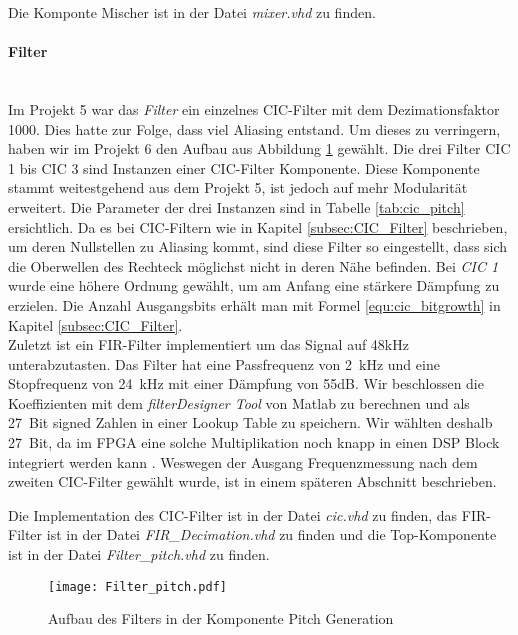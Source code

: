 Die Komponte Mischer ist in der Datei \textit{mixer.vhd} zu finden.

\paragraph{Filter}\mbox{}\\

Im Projekt 5 war das \textit{Filter} ein einzelnes CIC-Filter mit dem Dezimationsfaktor 1000. Dies hatte zur Folge, dass viel Aliasing entstand. Um dieses zu verringern, haben wir im Projekt 6 den Aufbau aus Abbildung \ref{img:Filter_Pitch} gewählt. Die drei Filter CIC 1 bis CIC 3 sind Instanzen einer CIC-Filter Komponente. Diese Komponente stammt weitestgehend aus dem Projekt 5, ist jedoch auf mehr Modularität erweitert. Die Parameter der drei Instanzen sind in Tabelle \ref{tab:cic_pitch} ersichtlich. Da es bei CIC-Filtern wie in Kapitel \ref{subsec:CIC_Filter} beschrieben, um deren Nullstellen zu Aliasing kommt, sind diese Filter so eingestellt, dass sich die Oberwellen des Rechteck möglichst nicht in deren Nähe befinden. Bei \textit{CIC 1} wurde eine höhere Ordnung gewählt, um am Anfang eine stärkere Dämpfung zu erzielen. Die Anzahl Ausgangsbits erhält man mit Formel \ref{equ:cic_bitgrowth} in Kapitel \ref{subsec:CIC_Filter}.\\
Zuletzt ist ein FIR-Filter implementiert um das Signal auf 48kHz unterabzutasten. Das Filter hat eine Passfrequenz von \SI{2}{kHz} und eine Stopfrequenz von \SI{24}{kHz} mit einer Dämpfung von 55dB. Wir beschlossen die Koeffizienten mit dem \textit{filterDesigner Tool} von Matlab zu berechnen und als \SI{27}{Bit} signed Zahlen in einer Lookup Table zu speichern. Wir wählten deshalb \SI{27}{Bit}, da im FPGA eine solche Multiplikation noch knapp in einen DSP Block integriert werden kann \cite{Cyclone_V}.
Weswegen der Ausgang Frequenzmessung nach dem zweiten CIC-Filter gewählt wurde, ist in einem späteren Abschnitt beschrieben.

Die Implementation des CIC-Filter ist in der Datei \textit{cic.vhd} zu finden, das FIR-Filter ist in der Datei \textit{FIR\_Decimation.vhd} zu finden und die Top-Komponente ist in der Datei \textit{Filter\_pitch.vhd} zu finden.


\begin{figure}[t]
	\centering
	\texttt{[image: Filter\_pitch.pdf]}
	\caption{Aufbau des Filters in der Komponente Pitch Generation} 
	\label{img:Filter_Pitch}
\end{figure}  

